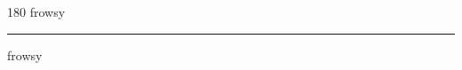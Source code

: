
\begin{frame}
\begin{center}
\begin{turn}{180}
{\fontsize{2.5cm}{1em}\selectfont frowsy}
\end{turn}
\vspace{1em}\par  
\hrule
\vspace{1em}\par  
{\fontsize{2.5cm}{1em}\selectfont frowsy}
\end{center}
\end{frame}
